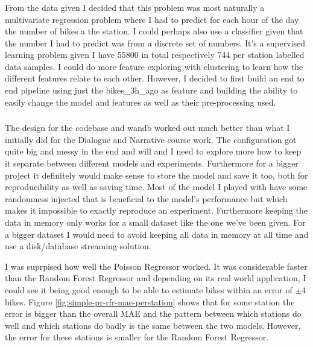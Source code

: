 \documentclass[a4paper]{article}
\begin{document}
    \subsubsection*{}
    From the data given I decided that this problem was most naturally a multivariate regression problem where I had to
    predict for each hour of the day the number of bikes a the station. I could perhaps also use a classifier given that
    the number I had to predict was from a discrete set of numbers. It's a supervised learning problem given I have 55800
    in total respectively 744 per station labelled data samples. I could do more feature exploring with clustering to
    learn how the different features relate to each other. However, I decided to first build an end to end pipeline using
    just the bikes\_3h\_ago as feature and building the ability to easily change the model and features as well as their
    pre-processing used.

    \subsubsection*{}
    The design for the codebase and wandb worked out much better than what I initially did for the Dialogue and Narrative
    course work. The configuration got quite big and messy in the end and will and I need to explore more how to
    keep it separate between different models and experiments. Furthermore for a bigger project it definitely would
    make sense to store the model and save it too, both for
    reproducibility as well as saving time. Most of the model I played with have some randomness injected that is
    beneficial to the model's performance but which makes it impossible to exactly reproduce an experiment. Furthermore
    keeping the data in memory only works for a small dataset like the one we've been given. For a bigger dataset I
    would need to avoid keeping all data in memory at all time and use a disk/database streaming solution.

    I was suprpised how well the Poisson Regressor worked. It was considerable faster than the Random Forest Regressor
    and depending on its real world application, I could see it being good enough to be able to estimate bikes within an error of $\pm$4 bikes.
    Figure \ref{fig:simple-pr-rfr-mae-perstation} shows that for some station the error is bigger
    than the overall MAE and the pattern between which stations do well and which stations do badly is the same between the
    two models. However, the error for these stations is smaller for the Random Forest Regressor.
\end{document}
